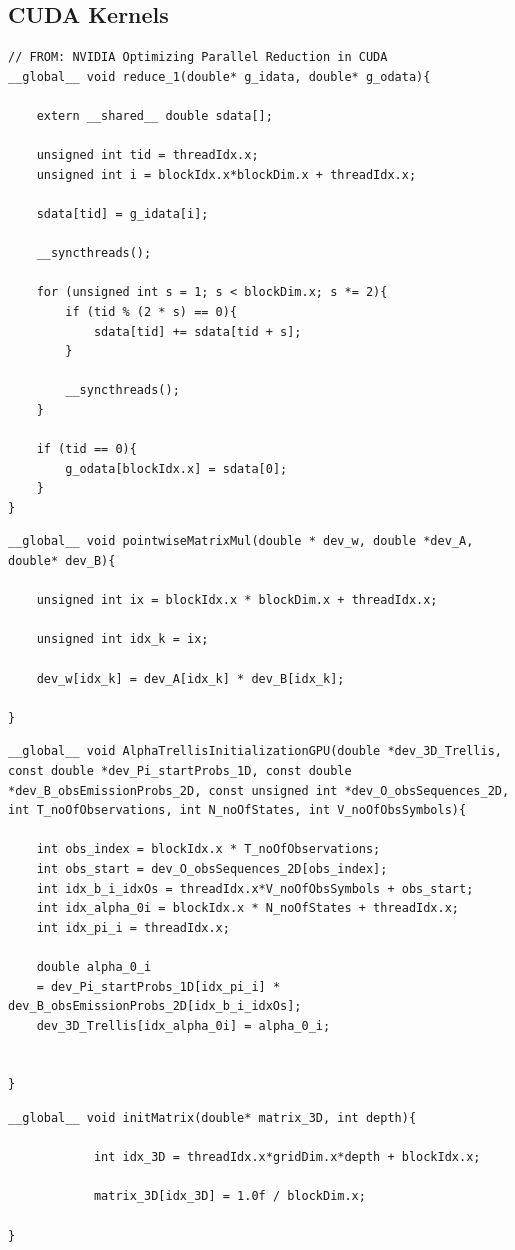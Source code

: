 \documentclass[english, paper=a4]{scrartcl}
\begin{document}
\subsection{CUDA Kernels}

\begin{verbatim}
// FROM: NVIDIA Optimizing Parallel Reduction in CUDA
__global__ void reduce_1(double* g_idata, double* g_odata){

	extern __shared__ double sdata[];

	unsigned int tid = threadIdx.x;
	unsigned int i = blockIdx.x*blockDim.x + threadIdx.x;

	sdata[tid] = g_idata[i];

	__syncthreads();

	for (unsigned int s = 1; s < blockDim.x; s *= 2){
		if (tid % (2 * s) == 0){
			sdata[tid] += sdata[tid + s];
		}

		__syncthreads();
	}

	if (tid == 0){
		g_odata[blockIdx.x] = sdata[0];
	}
}
\end{verbatim}

\begin{verbatim}
__global__ void pointwiseMatrixMul(double * dev_w, double *dev_A, double* dev_B){

	unsigned int ix = blockIdx.x * blockDim.x + threadIdx.x;

	unsigned int idx_k = ix;

	dev_w[idx_k] = dev_A[idx_k] * dev_B[idx_k];

}
\end{verbatim}

\begin{verbatim}
__global__ void AlphaTrellisInitializationGPU(double *dev_3D_Trellis, const double *dev_Pi_startProbs_1D, const double *dev_B_obsEmissionProbs_2D, const unsigned int *dev_O_obsSequences_2D, int T_noOfObservations, int N_noOfStates, int V_noOfObsSymbols){

	int obs_index = blockIdx.x * T_noOfObservations;
	int obs_start = dev_O_obsSequences_2D[obs_index];
	int idx_b_i_idxOs = threadIdx.x*V_noOfObsSymbols + obs_start;
	int idx_alpha_0i = blockIdx.x * N_noOfStates + threadIdx.x;
	int idx_pi_i = threadIdx.x;

	double alpha_0_i 
	= dev_Pi_startProbs_1D[idx_pi_i] * dev_B_obsEmissionProbs_2D[idx_b_i_idxOs];
	dev_3D_Trellis[idx_alpha_0i] = alpha_0_i;


}
\end{verbatim}

\begin{verbatim}
__global__ void initMatrix(double* matrix_3D, int depth){

			int idx_3D = threadIdx.x*gridDim.x*depth + blockIdx.x;

			matrix_3D[idx_3D] = 1.0f / blockDim.x;

}
\end{verbatim}
\end{document}
